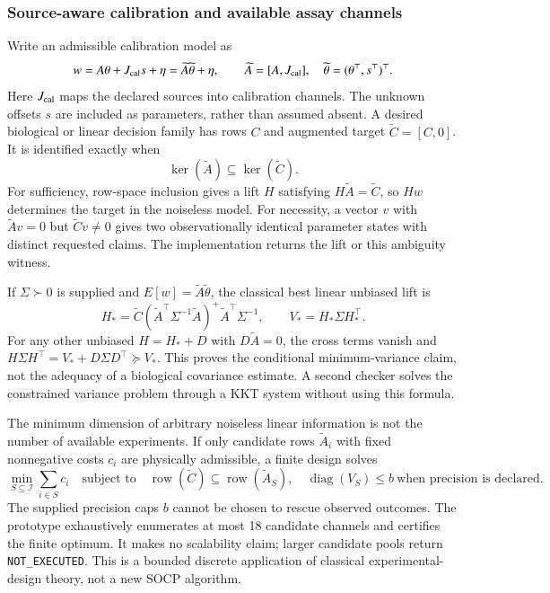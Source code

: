 \documentclass[11pt]{article}
\begin{document}
\subsubsection{Source-aware calibration and available assay channels}
Write an admissible calibration model as
\[
w=A\theta+J_{\rm cal}s+\eta=\widetilde A\widetilde\theta+\eta,
\qquad\widetilde A=[A,J_{\rm cal}],\quad\widetilde\theta=(\theta^\top,s^\top)^\top.
\]
Here $J_{\rm cal}$ maps the declared sources into calibration channels. The unknown offsets $s$ are included as parameters, rather than assumed absent. A desired biological or linear decision family has rows $C$ and augmented target $\widetilde C=[C,0]$. It is identified exactly when
\[
\ker(\widetilde A)\subseteq\ker(\widetilde C).
\label{eq:sourceclaiminformation}
\]
For sufficiency, row-space inclusion gives a lift $H$ satisfying $H\widetilde A=\widetilde C$, so $Hw$ determines the target in the noiseless model. For necessity, a vector $v$ with $\widetilde Av=0$ but $\widetilde Cv\ne0$ gives two observationally identical parameter states with distinct requested claims. The implementation returns the lift or this ambiguity witness.

If $\Sigma\succ0$ is supplied and $E[w]=\widetilde A\widetilde\theta$, the classical best linear unbiased lift is
\[
H_*=\widetilde C(\widetilde A^\top\Sigma^{-1}\widetilde A)^+
\widetilde A^\top\Sigma^{-1},\qquad
V_*=H_*\Sigma H_*^\top.
\]
For any other unbiased $H=H_*+D$ with $D\widetilde A=0$, the cross terms vanish and
$H\Sigma H^\top=V_*+D\Sigma D^\top\succeq V_*$. This proves the conditional minimum-variance claim, not the adequacy of a biological covariance estimate. A second checker solves the constrained variance problem through a KKT system without using this formula.

The minimum dimension of arbitrary noiseless linear information is not the number of available experiments. If only candidate rows $\widetilde A_i$ with fixed nonnegative costs $c_i$ are physically admissible, a finite design solves
\[
\min_{S\subseteq\mathcal I}\sum_{i\in S}c_i
\quad\text{subject to}\quad
\operatorname{row}(\widetilde C)\subseteq\operatorname{row}(\widetilde A_S),
\quad \operatorname{diag}(V_S)\leq b\ \text{when precision is declared}.
\]
The supplied precision caps $b$ cannot be chosen to rescue observed outcomes. The prototype exhaustively enumerates at most 18 candidate channels and certifies the finite optimum. It makes no scalability claim; larger candidate pools return \texttt{NOT\_EXECUTED}. This is a bounded discrete application of classical experimental-design theory, not a new SOCP algorithm.
\end{document}
